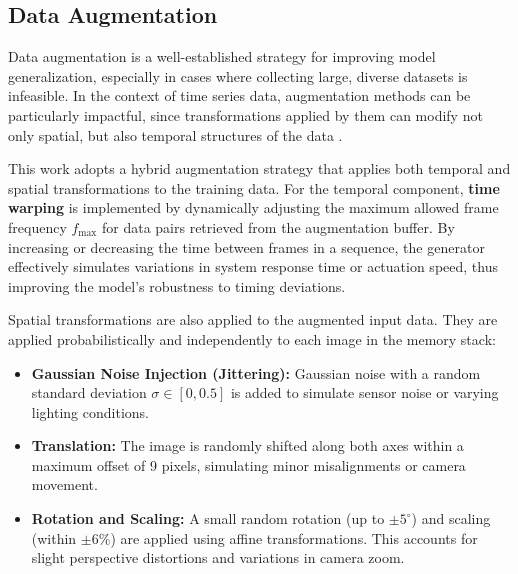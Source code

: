\subsection{Data Augmentation}
\label{sec:augmentation}

Data augmentation is a well-established strategy for improving model generalization, especially in cases where collecting large, diverse datasets is infeasible. In the context of time series data, augmentation methods can be particularly impactful, since transformations applied by them can modify not only spatial, but also temporal structures of the data \autocite{iglesias2023data}.

This work adopts a hybrid augmentation strategy that applies both temporal and spatial transformations to the training data. For the temporal component, \textbf{time warping} is implemented by dynamically adjusting the maximum allowed frame frequency \( f_{\text{max}} \) for data pairs retrieved from the augmentation buffer. By increasing or decreasing the time between frames in a sequence, the generator effectively simulates variations in system response time or actuation speed, thus improving the model's robustness to timing deviations.

Spatial transformations are also applied to the augmented input data. They are applied probabilistically and independently to each image in the memory stack:

\begin{itemize}
  \item \textbf{Gaussian Noise Injection (Jittering):} Gaussian noise with a random standard deviation \( \sigma \in [0, 0.5] \) is added to simulate sensor noise or varying lighting conditions.
  \item \textbf{Translation:} The image is randomly shifted along both axes within a maximum offset of 9 pixels, simulating minor misalignments or camera movement.
  \item \textbf{Rotation and Scaling:} A small random rotation (up to \( \pm 5^\circ \)) and scaling (within \( \pm 6\% \)) are applied using affine transformations. This accounts for slight perspective distortions and variations in camera zoom.
\end{itemize}

